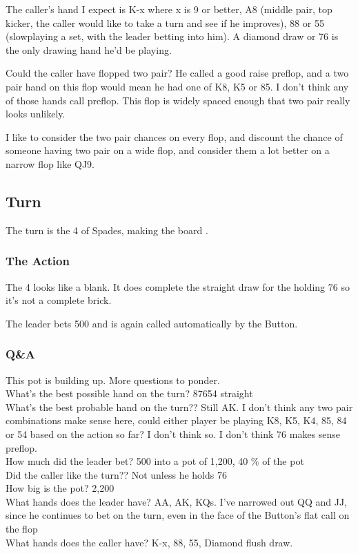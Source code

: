 The caller's hand I expect is K-x where x is 9 or better, A8 (middle pair,
top kicker, the caller would like to take a turn and see if he improves), 
88 or 55 (slowplaying a set, with the leader betting into him). A diamond
draw or 76 is the only drawing hand he'd be playing. 

Could the caller have flopped two pair? He called a good raise preflop,
and a two pair hand on this flop would mean he had one of K8, K5 or 85.
I don't think any of those hands call preflop. This flop is widely spaced
enough that two pair really looks unlikely.

I like to consider the two pair chances on every flop, and discount
the chance of someone having two pair on a wide flop, and consider
them a lot better on a narrow flop like QJ9.

\subsection*{Turn}

The turn is the 4 of Spades, making the board \Kc\eigd\fived\fours. 

\subsubsection*{The Action}
The 4 looks like a blank. It does complete the straight draw for
the holding 76 so it's not a complete brick.

The leader bets 500 and is again called automatically by 
the Button.

\subsubsection*{Q\&A}

This pot is building up. More questions to ponder. \\
What's the best possible hand on the turn? 87654 straight \\ 
What's the best probable hand on the turn?? Still AK. I don't think any
two pair combinations make sense here, could either player be playing
K8, K5, K4, 85, 84 or 54 based on the action so far? I don't think so. I
don't think 76 makes sense preflop. \\
How much did the leader bet? 500 into a pot of 1,200, 40 \% of the pot \\
Did the caller like the turn?? Not unless he holds 76 \\
How big is the pot? 2,200 \\
What hands does the leader have? AA, AK, KQs. I've narrowed out QQ and JJ,
since he continues to bet on the turn, even in the face of the Button's flat
call on the flop \\
What hands does the caller have? K-x, 88, 55, Diamond flush draw.

